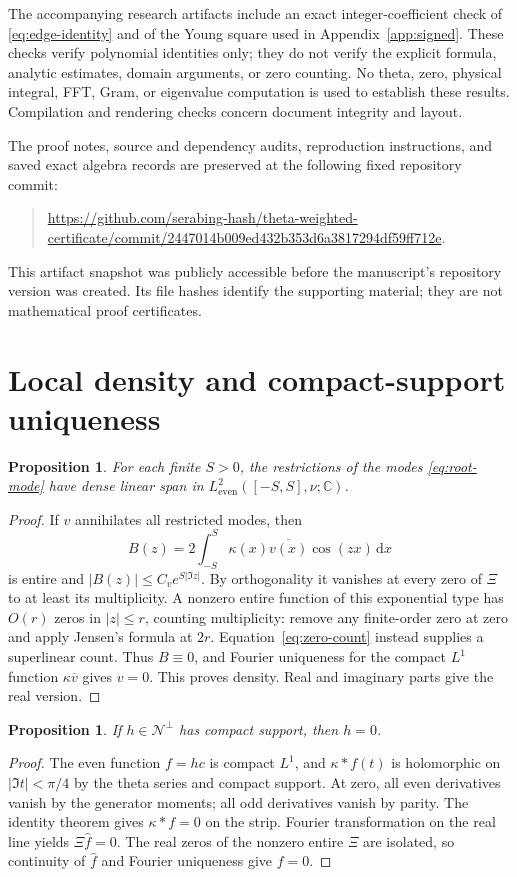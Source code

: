 \documentclass[11pt,a4paper]{article}
\newcommand{\C}{\mathbb C}
\newcommand{\NN}{\mathcal N}
\newcommand{\abs}[1]{\lvert #1\rvert}
\newcommand{\dd}{\,\mathrm d}
\newtheorem{proposition}[theorem]{Proposition}
\theoremstyle{definition}
\theoremstyle{remark}
\numberwithin{equation}{section}
\begin{document}
The accompanying research artifacts include an exact integer-coefficient
check of \eqref{eq:edge-identity} and of the Young square used in
Appendix~\ref{app:signed}. These checks verify polynomial identities only;
they do not verify the explicit formula, analytic estimates, domain
arguments, or zero counting. No theta, zero, physical integral, FFT, Gram,
or eigenvalue computation is used to establish these results. Compilation and
rendering checks concern document integrity and layout.

The proof notes, source and dependency audits, reproduction instructions,
and saved exact algebra records are preserved at the following fixed
repository commit:
\begin{quote}\small
\url{https://github.com/serabing-hash/theta-weighted-certificate/commit/2447014b009ed432b353d6a3817294df59ff712e}.
\end{quote}
This artifact snapshot was publicly accessible before the manuscript's
repository version was created. Its file hashes identify the supporting
material; they are not mathematical proof certificates.

\appendix
\section{Local density and compact-support uniqueness}\label{app:local}

\begin{proposition}\label{prop:local-density}
For each finite $S>0$, the restrictions of the modes
\eqref{eq:root-mode} have dense linear span in
$L^2_{\mathrm{even}}([-S,S],\nu;\C)$.
\end{proposition}
\begin{proof}
If $v$ annihilates all restricted modes, then
\[
 B(z)=2\int_{-S}^S\kappa(x)\overline{v(x)}\cos(zx)\dd x
\]
is entire and $\abs{B(z)}\le C_v e^{S\abs{\Im z}}$. By orthogonality
it vanishes at every zero of $\Xi$ to at least its multiplicity.
A nonzero entire function of this exponential type has $O(r)$ zeros in
$\abs z\le r$, counting multiplicity: remove any finite-order zero at
zero and apply Jensen's formula at $2r$. Equation~\eqref{eq:zero-count}
instead supplies a superlinear count. Thus $B\equiv0$, and Fourier
uniqueness for the compact $L^1$ function $\kappa\overline v$ gives
$v=0$. This proves density. Real and imaginary parts give the real version.
\end{proof}

\begin{proposition}\label{prop:compact-unique}
If $h\in\NN^\perp$ has compact support, then $h=0$.
\end{proposition}
\begin{proof}
The even function $f=hc$ is compact $L^1$, and $\kappa*f(t)$ is
holomorphic on $\abs{\Im t}<\pi/4$ by the theta series and compact
support. At zero, all even derivatives vanish by the generator moments;
all odd derivatives vanish by parity. The identity theorem gives
$\kappa*f=0$ on the strip. Fourier transformation on the real line yields
$\Xi\widehat f=0$. The real zeros of the nonzero entire $\Xi$ are
isolated, so continuity of $\widehat f$ and Fourier uniqueness give $f=0$.
\end{proof}
\end{document}
